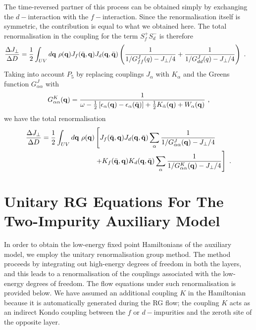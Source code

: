 \documentclass[%
reprint,
superscriptaddress,
groupedaddress,
superscriptaddress,
onecolumn,
10pt
]{revtex4-2}
\begin{document}
The time-reversed partner of this process can be obtained simply by exchanging the \(d-\)interaction with the \(f-\)interaction. Since the renormalisation itself is symmetric, the contribution is equal to what we obtained here. The total renormalisation in the coupling for the term \(S_f^+ S_d^-\) is therefore
\begin{equation}\begin{aligned}
	\frac{\Delta J_\perp}{\Delta D} &= \frac{1}{2} \int_{UV} d{\bf q} ~\rho({\bf q}) J_f(\bar{\bf q},{\bf q}) J_d({\bf q},\bar{\bf q})\left(\frac{1}{1/G^J_{ff}(q) - J_\perp/4} + \frac{1}{1/G^J_{dd}(q) - J_\perp/4}\right)~.
\end{aligned}\end{equation}
Taking into account \(P_5\) by replacing couplings \(J_\alpha\) with \(K_\alpha\) and the Greens function \(G^J_{\alpha\alpha}\) with
\begin{equation}\begin{aligned}
	G^{K}_{\alpha\alpha}({\bf q}) = \frac{1}{\omega - \frac{1}{2}\left[\epsilon_\alpha({\bf q}) - \epsilon_\alpha(\bar{\bf q})\right] + \frac{1}{2}K_{\bar\alpha}({\bf q}) + W_\alpha({\bf q})}~,
\end{aligned}\end{equation}
we have the total renormalisation
\begin{equation}\begin{aligned}
	\frac{\Delta J_\perp}{\Delta D} = \frac{1}{2} \int_{UV} d{\bf q} ~\rho({\bf q}) &\left[J_f(\bar{\bf q},{\bf q}) J_d({\bf q},\bar{\bf q})\sum_\alpha \frac{1}{1/G^J_{\alpha\alpha}({\bf q}) - J_\perp/4} \right.\\
									&\left.+ K_f(\bar{\bf q},{\bf q}) K_d({\bf q},\bar{\bf q})\sum_\alpha \frac{1}{1/G^K_{\alpha\alpha}({\bf q}) - J_\perp/4}\right]~.
\end{aligned}\end{equation}

\section{Unitary RG Equations For The Two-Impurity Auxiliary Model}\label{rgEquation}
In order to obtain the low-energy fixed point Hamiltonians of the auxiliary model, we employ the unitary renormalisation group method. The method proceeds by integrating out high-energy degrees of freedom in both the layers, and this leads to a renormalisation of the couplings associated with the low-energy degrees of freedom. The flow equations under such renormalisation is provided below. We have assumed an additional coupling \(K\) in the Hamiltonian because it is automatically generated during the RG flow; the coupling \(K\) acts as an indirect Kondo coupling between the \(f\) or \(d-\)impurities and the zeroth site of the opposite layer.
\end{document}
